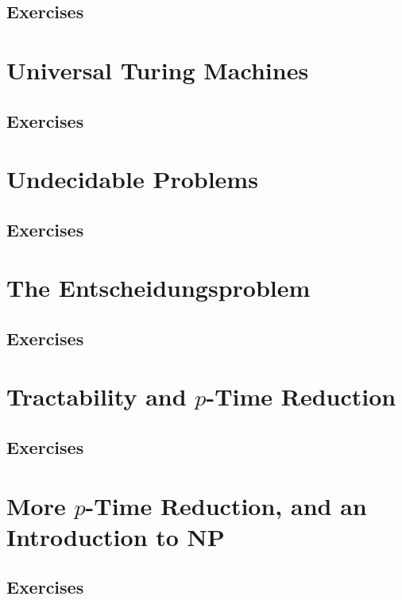 \documentclass{article}
\theoremstyle{plain}
\newcommand{\NP}{\mathbf{NP}}
\begin{document}
\subsection{Exercises}

\newpage

\section{Universal Turing Machines}

\subsection{Exercises}

\newpage

\section{Undecidable Problems}\label{S:und}

\subsection{Exercises}

\newpage

\section{The Entscheidungsproblem}

\subsection{Exercises}

\newpage

\section{Tractability and $p$-Time Reduction}

\subsection{Exercises}

\newpage

\section{More $p$-Time Reduction, and an Introduction to $\NP$}

\subsection{Exercises}

\newpage
\end{document}
